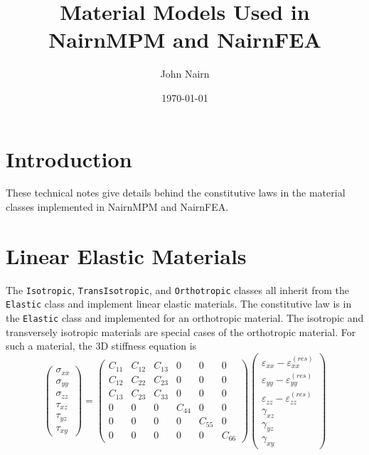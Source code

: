 \documentclass[11pt]{article}
\title{Material Models Used in NairnMPM and NairnFEA}
\author{John Nairn}
\date{\today}
\def\code#1{{\small\tt #1}}
\def\e#1{\varepsilon_{#1}}
\def\er#1{\varepsilon_{#1}^{(res)}}
\def\g#1{\gamma_{#1}}
\def\s#1{\sigma_{#1}}
\def\t#1{\tau_{#1}}
\begin{document}
\maketitle

\section{Introduction}

These technical notes give details behind the constitutive laws in the material classes implemented in NairnMPM and NairnFEA.

\section{Linear Elastic Materials}

The \code{Isotropic}, \code{TransIsotropic}, and \code{Orthotropic} classes all inherit from the \code{Elastic} class and implement linear elastic materials. The constitutive law is in the \code{Elastic} class and implemented for an orthotropic material. The isotropic and transversely isotropic materials are special cases of the orthotropic material. For such a material, the 3D stiffness equation is
\begin{equation}
     \left(\begin{array}{c} \s{xx} \\ \s{yy} \\ \s{zz} \\ \t{xz} \\ \t{yz} \\ \t{xy} \end{array}\right)
       =  \left(\begin{array}{cccccc}
      C_{11} & C_{12} & C_{13} & 0 & 0 & 0 \\
      C_{12} & C_{22} & C_{23} & 0 & 0 & 0 \\
      C_{13} & C_{23} & C_{33} & 0 & 0 & 0 \\
      0 & 0 & 0 & C_{44} & 0 & 0 \\
      0 & 0 & 0 & 0 & C_{55} & 0  \\
      0 & 0 & 0 & 0 & 0 &  C_{66}  \end{array}\right)
     \left(\begin{array}{c} \e{xx} -\er{xx} \\ \e{yy} -\er{yy} \\ \e{zz} -\er{zz}\\ 
                   \g{xz} \\ \g{yz} \\ \g{xy} \end{array}\right)
\end{equation}
\end{document}
